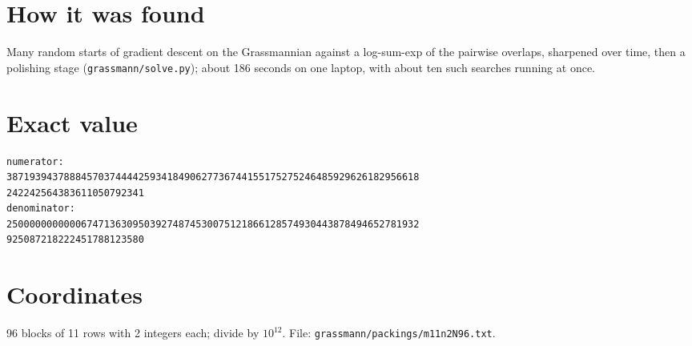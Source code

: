 \documentclass[11pt,a4paper]{article}
\begin{document}
\section{How it was found}
Many random starts of gradient descent on the Grassmannian against a log-sum-exp of the pairwise overlaps, sharpened over time, then a polishing stage (\texttt{grassmann/solve.py}); about 186 seconds on one laptop, with about ten such searches running at once.


\appendix
\section{Exact value}
{\small
\begin{verbatim}
numerator:
387193943788845703744442593418490627736744155175275246485929626182956618
242242564383611050792341
denominator:
250000000000067471363095039274874530075121866128574930443878494652781932
925087218222451788123580
\end{verbatim}}

\section{Coordinates}
96 blocks of 11 rows with 2 integers each; divide by $10^{12}$. File: \texttt{grassmann/packings/m11n2N96.txt}.
{\tiny
\begin{multicols}{4}
\end{multicols}}
\end{document}
